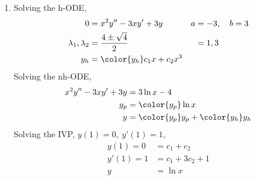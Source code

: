 \begin{enumerate}
    \item Solving the h-ODE,
          \begin{align}
              0                        & = x^{2}y'' - 3xy' + 3y            &
              a                        & = -3, \quad b = 3                   \\
              \lambda_{1}, \lambda_{2} & = \frac{4 \pm \sqrt{4}}{2}        &
                                       & = 1, 3                              \\
              y_{h}                    & = \color{y_h} c_{1}x + c_{2}x^{3}
          \end{align}
          Solving the nh-ODE,
          \begin{align}
              x^{2}y'' - 3xy' + 3y & = 3\ln x - 4                                \\
              y_{p}                & = \color{y_p} \ln x                         \\
              y                    & = {\color{y_p} y_{p}} + {\color{y_h} y_{h}}
          \end{align}
          Solving the IVP, $ y(1) = 0,\ y'(1) = 1 $,
          \begin{align}
              y(1) = 0  & = c_{1} + c_{2}      \\
              y'(1) = 1 & = c_{1} + 3c_{2} + 1 \\
              y         & = \ln x
          \end{align}


\end{enumerate}

